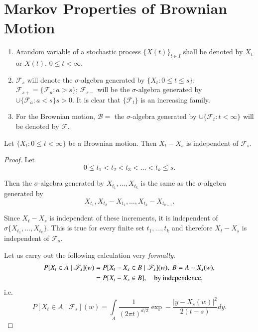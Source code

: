 \chapter{Markov Properties of Brownian Motion}\label{chap6}

\begin{notation*}
\begin{enumerate}
\item A\pageoriginale random variable of a stochastic process
  $\{X(t)\}_{t\in I}$ shall be denoted by $X_{t}$ or $X(t)$. $0\leq
  t<\infty$. 

\item $\mathscr{F}_{s}$ will denote the $\sigma$-algebra generated by
  $\{X_{t}:0\leq t\leq s\}$;
  $\mathscr{F}_{s+}=\{\mathscr{F}_{a}:a>s\}$; $\mathscr{F}_{s-}$ will
  be the $\sigma$-algebra generated by
  $\cup\{\mathscr{F}_{a}:a<s\}s>0$. It is clear that
  $\{\mathscr{F}_{t}\}$ is an increasing family.

\item For the Brownian motion, $\mathscr{B}=$ the $\sigma$-algebra
  generated by $\cup\{\mathscr{F}_{t}:t<\infty\}$ will be denoted by
  $\mathscr{F}$. 
\end{enumerate}
\end{notation*}

\begin{theorem*}
Let $\{X_{t}:0\leq t<\infty\}$ be a Brownian motion. Then
$X_{t}-X_{s}$ is independent of $\mathscr{F}_{s}$.
\end{theorem*}

\begin{proof}
Let
$$
0\leq t_{1}<t_{2}<t_{3}<\ldots<t_{k}\leq s.
$$

Then the $\sigma$-algebra generated by $X_{t_{1}},\ldots,X_{t_{k}}$ is
the same as the $\sigma$-algebra generated by
$$
X_{t_{1}},X_{t_{2}}-X_{t_{1}},\ldots,X_{t_{k}}-X_{t_{k-1}}.
$$

Since $X_{t}-X_{s}$ is independent of these increments, it is
independent of $\sigma\{X_{t_{1}},\ldots,X_{t_{k}}\}$. This is true
for every finite set $t_{1},\ldots,t_{k}$ and therefore $X_{t}-X_{s}$
is independent of $\mathscr{F}_{s}$.

Let us carry out the following calculation very {\em formally}. 
\begin{align*}
P[X_{t}\in A\mid\mathscr{F}_{s}](w) &= P[X_{t}-X_{s}\in B\mid
  \mathscr{F}_{s}](w),\ B=A-X_{s}(w),\\
&= P[X_{t}-X_{s}\in B],\quad \text{by independence,}
\end{align*}
i.e.\pageoriginale
$$
P[X_{t}\in A\mid\mathscr{F}_{s}](w)=\int\limits_{A}\frac{1}{(2\pi
  t)^{d/2}}\exp -\frac{|y-X_{s}(w)|^{2}}{2(t-s)}dy.
$$
\end{proof}

